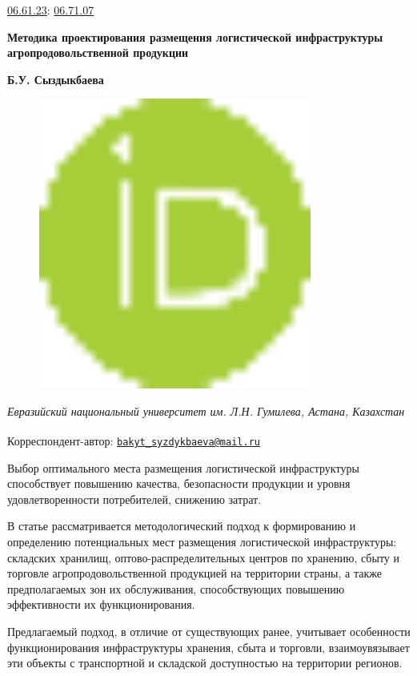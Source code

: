\href{https://grnti.ru/?p1=06&p2=61&p3=23}{06.61.23}:
\href{https://grnti.ru/?p1=06&p2=71&p3=07}{06.71.07}

{\bfseries Методика проектирования размещения логистической инфраструктуры
агропродовольственной продукции}

{\bfseries Б.У. Сыздыкбаева}
\begin{figure}[H]
	\centering
	\includegraphics[width=0.8\textwidth]{media/ekon2/image7}
	\caption*{}
\end{figure}


\emph{Евразийский национальный университет им. Л.Н. Гумилева, Астана,
Казахстан}

{\bfseries \textsuperscript{\envelope }}Корреспондент-автор:
\href{mailto:bakyt_syzdykbaeva@mail.ru}{\nolinkurl{bakyt\_syzdykbaeva@mail.ru}}

Выбор оптимального места размещения логистической инфраструктуры
способствует повышению качества, безопасности продукции и уровня
удовлетворенности потребителей, снижению затрат.

В статье рассматривается методологический подход к формированию и
определению потенциальных мест размещения логистической инфраструктуры:
складских хранилищ, оптово-распределительных центров по хранению, сбыту
и торговле агропродовольственной продукцией на территории страны, а
также предполагаемых зон их обслуживания, способствующих повышению
эффективности их функционирования.

Предлагаемый подход, в отличие от существующих ранее, учитывает
особенности функционирования инфраструктуры хранения, сбыта и торговли,
взаимоувязывает эти объекты с транспортной и складской доступностью на
территории регионов.

